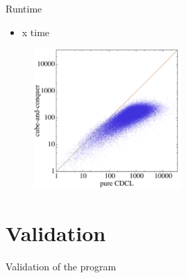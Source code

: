 \documentclass[c,8pt,xcolor...,x11names]{beamer}
\begin{document}
\begin{frame}{Runtime}
	\begin{itemize}
		\item x time
	\end{itemize}
	\begin{figure}
		\includegraphics[width=0.5\textwidth]{images/plot1.png} 
	\end{figure}
\end{frame}

\section{Validation}
\begin{frame}{Validation of the program}
\end{frame}
\end{document}
